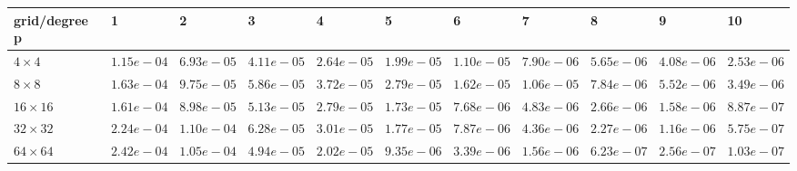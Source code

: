 \begin{tabular}{lllllllllll}
\hline
 grid/degree p   & 1          & 2          & 3          & 4          & 5          & 6          & 7          & 8          & 9          & 10         \\
\hline
 $4 \times 4$    & $1.15e-04$ & $6.93e-05$ & $4.11e-05$ & $2.64e-05$ & $1.99e-05$ & $1.10e-05$ & $7.90e-06$ & $5.65e-06$ & $4.08e-06$ & $2.53e-06$ \\
 $8 \times 8$    & $1.63e-04$ & $9.75e-05$ & $5.86e-05$ & $3.72e-05$ & $2.79e-05$ & $1.62e-05$ & $1.06e-05$ & $7.84e-06$ & $5.52e-06$ & $3.49e-06$ \\
 $16 \times 16$  & $1.61e-04$ & $8.98e-05$ & $5.13e-05$ & $2.79e-05$ & $1.73e-05$ & $7.68e-06$ & $4.83e-06$ & $2.66e-06$ & $1.58e-06$ & $8.87e-07$ \\
 $32 \times 32$  & $2.24e-04$ & $1.10e-04$ & $6.28e-05$ & $3.01e-05$ & $1.77e-05$ & $7.87e-06$ & $4.36e-06$ & $2.27e-06$ & $1.16e-06$ & $5.75e-07$ \\
 $64 \times 64$  & $2.42e-04$ & $1.05e-04$ & $4.94e-05$ & $2.02e-05$ & $9.35e-06$ & $3.39e-06$ & $1.56e-06$ & $6.23e-07$ & $2.56e-07$ & $1.03e-07$ \\
\hline
\end{tabular}